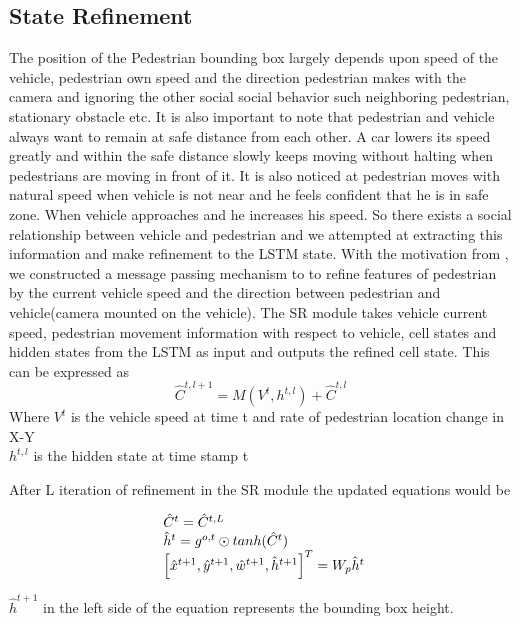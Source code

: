 \subsection{State Refinement}
The position of the Pedestrian bounding box largely depends upon speed of the vehicle, pedestrian own speed and the direction pedestrian makes with the camera and ignoring the other social social behavior such neighboring pedestrian, stationary obstacle etc. It is also important to note that pedestrian and vehicle always want to remain at safe distance from each other. A car lowers its speed greatly and within the safe distance slowly keeps moving without halting when pedestrians are moving in front of it.
It is also noticed at pedestrian moves with natural speed when vehicle is not near and he feels confident that he is in safe zone. When vehicle approaches and he increases his speed. So there exists a social relationship between vehicle and pedestrian and we attempted at extracting this information and make refinement to the LSTM state. With the motivation from \cite{zhang2019sr}, we constructed a message passing mechanism to to refine features of pedestrian by the current vehicle speed and the direction between pedestrian and vehicle(camera mounted on the vehicle). The SR module takes vehicle current speed, pedestrian movement information with respect to vehicle, cell states and hidden states from the LSTM as input and outputs the refined cell state. This can be expressed as 
\begin{equation}
\hat{C}^{t, l+1}= M(V^t, {h}^{t, l}) + \hat{C}^{t, l}
\end{equation}
Where $V^t$ is the vehicle speed at time t and rate of pedestrian location change in X-Y \\
${h}^{t, l}$ is the hidden state at time stamp t

After L iteration of refinement in the SR module the updated equations would be

\begin{equation}
\begin{array}{l@{}}
\hat{C}^{t}=\hat{C}^{t, L} \\
\hat{h}^{t}={g}^{o,t} \odot  tanh(\hat{C}^{t}) \\
\left[ \hat{x}^{t+1}, \hat{y}^{t+1}, \hat{w}^{t+1}, \hat{h}^{t+1} \right] ^ T = W_p\hat{h}^{t}
\end{array}
\end{equation}

$ \hat{h}^{t+1}$ in the left side of the equation represents the bounding box height.

